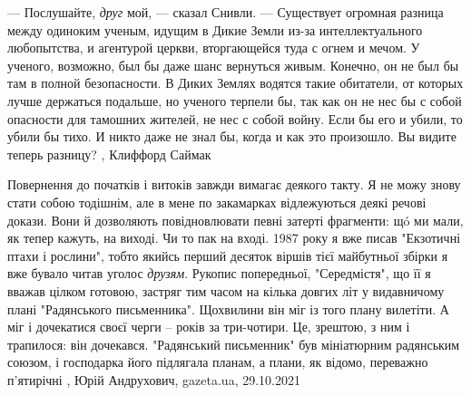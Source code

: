 — Послушайте, \emph{друг} мой, — сказал Снивли. — Существует огромная разница между
одиноким ученым, идущим в Дикие Земли из-за интеллектуального любопытства, и
агентурой церкви, вторгающейся туда с огнем и мечом. У ученого, возможно, был
бы даже шанс вернуться живым. Конечно, он не был бы там в полной безопасности.
В Диких Землях водятся такие обитатели, от которых лучше держаться подальше, но
ученого терпели бы, так как он не нес бы с собой опасности для тамошних
жителей, не нес с собой войну. Если бы его и убили, то убили бы тихо. И никто
даже не знал бы, когда и как это произошло. Вы видите теперь разницу?
, Клиффорд Саймак

Повернення до початків і витоків завжди вимагає деякого такту. Я не можу знову
стати собою тодішнім, але в мене по закамарках відлежуються деякі речові
докази.  Вони й дозволяють повідновлювати певні затерті фрагменти: щó ми мали,
як тепер кажуть, на виході. Чи то пак на вході.  1987 року я вже писав
"Екзотичні птахи і рослини", тобто якийсь перший десяток віршів тієї майбутньої
збірки я вже бувало читав уголос \emph{друзям}. Рукопис попередньої, "Середмістя", що
її я вважав цілком готовою, застряг тим часом на кілька довгих літ у
видавничому плані "Радянського письменника". Щохвилини він міг із того плану
вилетіти. А міг і дочекатися своєї черги – років за три-чотири. Це, зрештою, з
ним і трапилося: він дочекався. "Радянський письменник" був мініатюрним
радянським союзом, і господарка його підлягала планам, а плани, як відомо,
переважно п'ятирічні
, 
Юрій Андрухович, gazeta.ua, 29.10.2021

